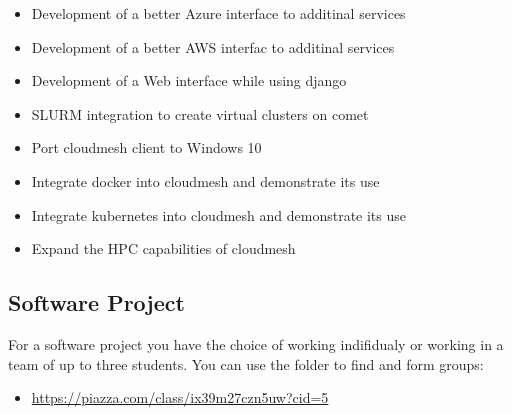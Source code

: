 \begin{itemize}
\begin{itemize}
\item {} 
Development of a better Azure interface to additinal services

\item {} 
Development of a better AWS interfac to additinal services

\item {} 
Development of a Web interface while using django

\item {} 
SLURM integration to create virtual clusters on comet

\item {} 
Port cloudmesh client to Windows 10

\item {} 
Integrate docker into cloudmesh and demonstrate its use

\item {} 
Integrate kubernetes into cloudmesh and demonstrate its use

\item {} 
Expand the HPC capabilities of cloudmesh

\end{itemize}

\end{itemize}


\subsection{Software Project}
\label{\detokenize{i524/index:software-project}}
For a software project you have the choice of working indifidualy or
working in a team of up to three students. You can use the  folder to find and form groups:
\begin{itemize}
\item {} 
\url{https://piazza.com/class/ix39m27czn5uw?cid=5}

\end{itemize}

